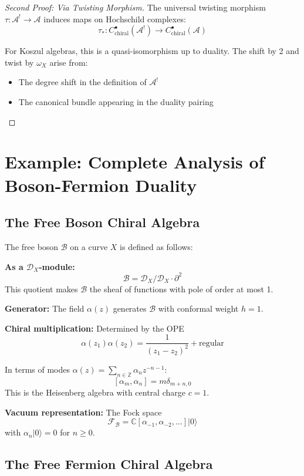 \begin{proof}[Second Proof: Via Twisting Morphism]
The universal twisting morphism $\tau: \mathcal{A}^! \to \mathcal{A}$ induces maps on Hochschild complexes:
\[
\tau_*: C^{\bullet}_{\text{chiral}}(\mathcal{A}^!) \to C^{\bullet}_{\text{chiral}}(\mathcal{A})
\]

For Koszul algebras, this is a quasi-isomorphism up to duality. The shift by 2 and twist by $\omega_X$ arise from:
\begin{itemize}
\item The degree shift in the definition of $\mathcal{A}^!$
\item The canonical bundle appearing in the duality pairing
\end{itemize}
\end{proof}

\section{Example: Complete Analysis of Boson-Fermion Duality}

\subsection{The Free Boson Chiral Algebra}

The free boson $\mathcal{B}$ on a curve $X$ is defined as follows:

\textbf{As a $\mathcal{D}_X$-module:}
\[
\mathcal{B} = \mathcal{D}_X / \mathcal{D}_X \cdot \partial^2
\]
This quotient makes $\mathcal{B}$ the sheaf of functions with pole of order at most 1.

\textbf{Generator:} The field $\alpha(z)$ generates $\mathcal{B}$ with conformal weight $h = 1$.

\textbf{Chiral multiplication:} Determined by the OPE
\[
\alpha(z_1) \alpha(z_2) = \frac{1}{(z_1-z_2)^2} + \text{regular}
\]

In terms of modes $\alpha(z) = \sum_{n \in \mathbb{Z}} \alpha_n z^{-n-1}$:
\[
[\alpha_m, \alpha_n] = m \delta_{m+n,0}
\]
This is the Heisenberg algebra with central charge $c = 1$.

\textbf{Vacuum representation:} The Fock space
\[
\mathcal{F}_{\mathcal{B}} = \mathbb{C}[\alpha_{-1}, \alpha_{-2}, \ldots] |0\rangle
\]
with $\alpha_n |0\rangle = 0$ for $n \geq 0$.

\subsection{The Free Fermion Chiral Algebra}

